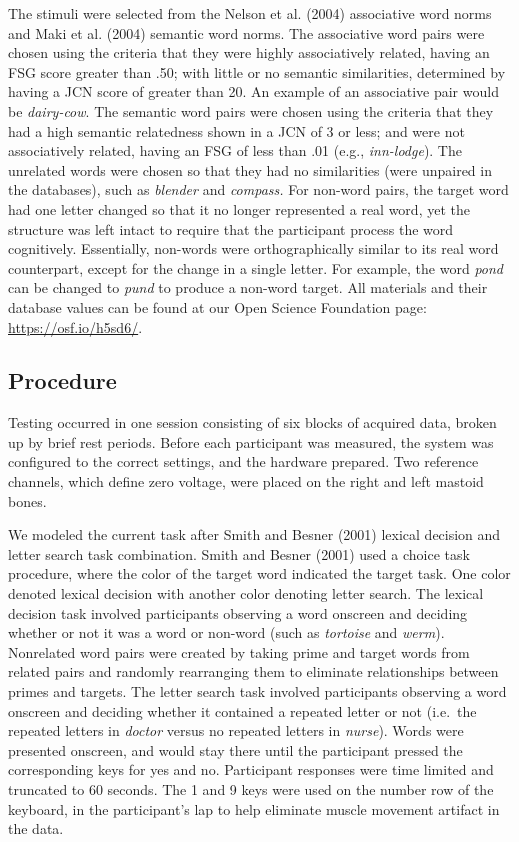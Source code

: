 \documentclass[english,man]{apa6}
\theoremstyle{definition}
\theoremstyle{definition}
\theoremstyle{definition}
\theoremstyle{remark}
\begin{document}
The stimuli were selected from the Nelson et al. (2004) associative word
norms and Maki et al. (2004) semantic word norms. The associative word
pairs were chosen using the criteria that they were highly associatively
related, having an FSG score greater than .50; with little or no
semantic similarities, determined by having a JCN score of greater than
20. An example of an associative pair would be \emph{dairy-cow}. The
semantic word pairs were chosen using the criteria that they had a high
semantic relatedness shown in a JCN of 3 or less; and were not
associatively related, having an FSG of less than .01 (e.g.,
\emph{inn-lodge}). The unrelated words were chosen so that they had no
similarities (were unpaired in the databases), such as \emph{blender}
and \emph{compass.} For non-word pairs, the target word had one letter
changed so that it no longer represented a real word, yet the structure
was left intact to require that the participant process the word
cognitively. Essentially, non-words were orthographically similar to its
real word counterpart, except for the change in a single letter. For
example, the word \emph{pond} can be changed to \emph{pund} to produce a
non-word target. All materials and their database values can be found at
our Open Science Foundation page: \url{https://osf.io/h5sd6/}.

\subsection{Procedure}\label{procedure}

Testing occurred in one session consisting of six blocks of acquired
data, broken up by brief rest periods. Before each participant was
measured, the system was configured to the correct settings, and the
hardware prepared. Two reference channels, which define zero voltage,
were placed on the right and left mastoid bones.

We modeled the current task after Smith and Besner (2001) lexical
decision and letter search task combination. Smith and Besner (2001)
used a choice task procedure, where the color of the target word
indicated the target task. One color denoted lexical decision with
another color denoting letter search. The lexical decision task involved
participants observing a word onscreen and deciding whether or not it
was a word or non-word (such as \emph{tortoise} and \emph{werm}).
Nonrelated word pairs were created by taking prime and target words from
related pairs and randomly rearranging them to eliminate relationships
between primes and targets. The letter search task involved participants
observing a word onscreen and deciding whether it contained a repeated
letter or not (i.e.~the repeated letters in \emph{doctor} versus no
repeated letters in \emph{nurse}). Words were presented onscreen, and
would stay there until the participant pressed the corresponding keys
for yes and no. Participant responses were time limited and truncated to
60 seconds. The 1 and 9 keys were used on the number row of the
keyboard, in the participant's lap to help eliminate muscle movement
artifact in the data.
\end{document}
